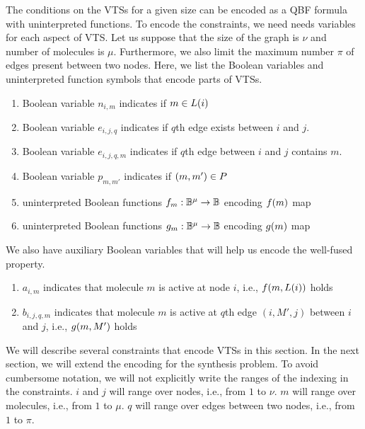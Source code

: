The conditions on the VTSs for a given size can be encoded as a QBF formula
with uninterpreted functions.
%
To encode the constraints, we need needs variables for each aspect of
VTS.
%
Let us suppose that the size of the graph is $\nu$ and number of
molecules is $\mu$.
%
Furthermore, we also limit the maximum number $\pi$ of edges present
between two nodes.
%
Here, we list the Boolean variables and uninterpreted function symbols
that encode parts of VTSs.
\begin{enumerate}

\item Boolean variable $n_{i,m}$ indicates if $m \in L(i)$
\item Boolean variable $e_{i,j,q}$ indicates if $q$th edge exists between $i$ and $j$.
\item Boolean variable $e_{i,j,q,m}$ indicates if $q$th edge between $i$ and $j$ contains $m$.
\item Boolean variable $p_{m,m'}$ indicates if $(m,m') \in P$
\item uninterpreted Boolean functions $f_m : \mathbb{B}^\mu \rightarrow \mathbb{B}$
encoding $f(m)$ map
\item uninterpreted Boolean functions $g_m : \mathbb{B}^\mu \rightarrow \mathbb{B}$
encoding $g(m)$ map
\end{enumerate}
We also have auxiliary Boolean variables that will help us encode the well-fused property. 
\begin{enumerate}
\item $a_{i,m}$ indicates that molecule $m$ is active at node $i$, i.e., $f(m,L(i))$
  holds
\item $b_{i,j,q,m}$ indicates that molecule $m$ is active at $q$th edge $(i,M',j)$ between $i$ and $j$, i.e., $g(m,M')$ holds
\end{enumerate}

We will describe several constraints that encode VTSs in this section.
%
In the next section, we will extend the encoding for the synthesis problem.
%
To avoid cumbersome notation, we will not explicitly write the ranges
of the indexing in the constraints.
%
$i$ and $j$ will range over nodes, i.e., from $1$ to $\nu$.
%
$m$ will range over molecules, i.e., from $1$ to $\mu$.
%
$q$ will range over edges between two nodes, i.e., from $1$ to $\pi$.
%

